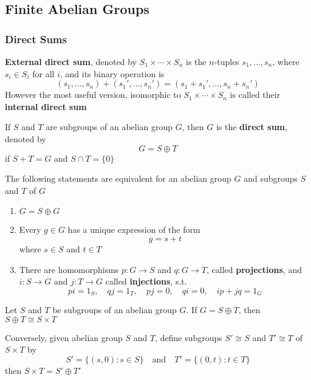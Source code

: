 \documentclass[11pt]{article}
\begin{document}
\subsection{Finite Abelian Groups}
\label{sec:org2933845}
\subsubsection{Direct Sums}
\label{sec:orgdad13ad}
\textbf{External direct sum}, denoted by \(S_1\times\cdots\times S_n\) is the
\(n\)-tuples \(s_1,\dots,s_n\), where \(s_i\in S_i\) for all \(i\), and its
binary operation is 
\begin{equation*}
(s_1,\dots,s_n)+(s_1',\dots,s_n')=(s_1+s_1',\dots,s_n+s_n')
\end{equation*}
However the most useful version, isomorphic to \(S_1\times\cdots\times S_n\)
is called their \textbf{internal direct sum}

\begin{definition}[]
If \(S\) and \(T\) are subgroups of an abelian group \(G\), then \(G\) is the
\textbf{direct sum}, denoted by
\begin{equation*}
G=S\oplus T
\end{equation*}
if \(S+T=G\) and \(S\cap T=\{0\}\)
\end{definition}

\begin{proposition}[]
The following statements are equivalent for an abelian group \(G\) and
subgroups \(S\) and \(T\) of \(G\)
\begin{enumerate}
\item \(G=S\oplus G\)
\item Every \(g\in G\) has a unique expression of the form
\begin{equation*}
g=s+t
\end{equation*}
where \(s\in S\) and \(t\in T\)
\item There are homomorphisms \(p:G\to S\) and \(q:G\to T\), called
\textbf{projections}, and \(i:S\to G\) and \(j:T\to G\) called \textbf{injections}, s.t.
\begin{equation*}
pi=1_S,\quad qj=1_T,\quad pj=0,\quad qi=0,\quad ip+jq=1_G
\end{equation*}
\end{enumerate}
\end{proposition}

\begin{corollary}[]
Let \(S\) and \(T\) be subgroups of an abelian group \(G\). If \(G=S\oplus T\),
then \(S\oplus T\cong S\times T\)

Conversely, given abelian group \(S\) and \(T\), define subgroups \(S'\cong S\)
and \(T'\cong T\) of \(S\times T\) by
\begin{equation*}
S'=\{(s,0):s\in S\}\quad\text{and}\quad T'=\{(0,t):t\in T\}
\end{equation*}
then \(S\times T=S'\oplus T'\)
\end{corollary}
\end{document}
